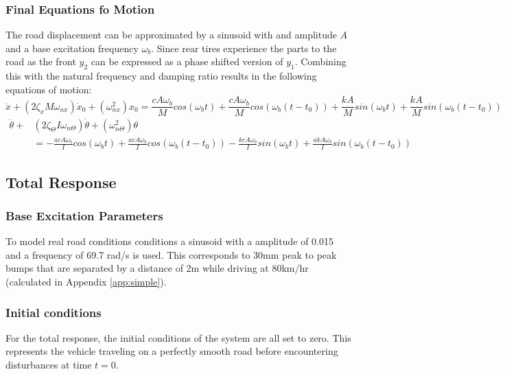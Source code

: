 \documentclass[12pt]{article}
\begin{document}
\subsubsection{Final Equations fo Motion}
The road displacement can be approximated by a sinusoid with and amplitude $A$ and a base excitation frequency $\omega _b$. Since rear tires experience the parts to the road as the front $y_2$ can be expressed as a phase shifted version of $y_1$. Combining this with the natural frequency and damping ratio results in the following equations of motion: 
\begin{equation}
	\label{eq:eomx}
	\ddot x + (2\zeta _x M \omega _{nx}) \dot x_0 + (\omega _{nx}^2)x_0 = \frac{cA\omega _b}{M}cos(\omega _b t) + \frac{cA\omega _b}{M}cos(\omega _b (t-t_0))  + \frac{kA}{M}sin(\omega _b t) + \frac{kA}{M}sin(\omega _b (t-t_0))
\end{equation}
\begin{equation}
	\label{eq:eomtheta}
	\begin{split}
		\ddot\theta + &(2\zeta _\Theta  I \omega _{n\Theta}) \dot\theta + (\omega _{n\Theta}^2)\theta \\&= -\frac{acA\omega _b}{I}cos(\omega _b t) + \frac{acA\omega _b}{I}cos(\omega _b (t-t_0)) - \frac{kcA\omega _b}{I}sin(\omega _b t) + \frac{akA\omega _b}{I}sin(\omega _b (t-t_0))
	\end{split}
\end{equation}

\subsection{Total Response}
\subsubsection{Base Excitation Parameters}
To model real road conditions conditions a sinusoid with a amplitude of 0.015 and a frequency of 69.7 rad/s is used. This corresponds to 30mm peak to peak bumps that are separated by a distance of 2m while driving at 80km/hr (calculated in Appendix \ref{app:simple}). 

\subsubsection{Initial conditions}
For the total response, the initial conditions of the system are all set to zero. This represents the vehicle traveling on a perfectly smooth road before encountering disturbances at time $t = 0$. 
\end{document}
